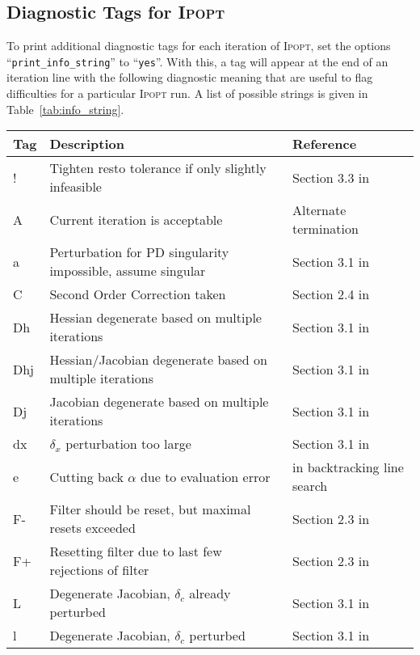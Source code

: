 \documentclass[10pt]{article}
\newcommand{\Ipopt}{\textsc{Ipopt}\xspace}
\begin{document}
\subsection{Diagnostic Tags for \Ipopt}

To print additional diagnostic tags for each iteration of \Ipopt, set
the options ``\texttt{print\_info\_string}'' to ``\texttt{yes}''. With
this, a tag will appear at the end of an iteration line with the
following diagnostic meaning that are useful to flag difficulties for
a particular \Ipopt run.  A list of possible strings is given in
Table~\ref{tab:info_string}.

\begin{table}\centering
  \begin{tabular}{@{}lll@{}}
    Tag & Description & Reference \\
    \hline 
    ! & Tighten resto tolerance if only slightly infeasible & Section 3.3 in \cite{WaecBieg06:mp} \\ 
    A & Current iteration is acceptable & Alternate termination \\  
    a & Perturbation for PD singularity impossible, assume singular & Section 3.1 in \cite{WaecBieg06:mp}\\  
    C & Second Order Correction taken & Section 2.4 in \cite{WaecBieg06:mp} \\  
    Dh & Hessian degenerate based on multiple iterations & Section 3.1 in \cite{WaecBieg06:mp}\\  
    Dhj & Hessian/Jacobian degenerate based on multiple iterations & Section 3.1 in \cite{WaecBieg06:mp}\\  
    Dj & Jacobian degenerate based on multiple iterations & Section 3.1 in \cite{WaecBieg06:mp}\\  
    dx & $\delta_x$ perturbation too large & Section 3.1 in \cite{WaecBieg06:mp}\\  
    e & Cutting back $\alpha$ due to evaluation error & in backtracking line search \\  
    F- & Filter should be reset, but maximal resets exceeded & Section 2.3 in \cite{WaecBieg06:mp} \\  
    F+ & Resetting filter due to last few rejections of filter & Section 2.3 in \cite{WaecBieg06:mp} \\  
    L & Degenerate Jacobian, $\delta_c$ already perturbed & Section 3.1 in \cite{WaecBieg06:mp}\\  
    l & Degenerate Jacobian, $\delta_c$ perturbed & Section 3.1 in \cite{WaecBieg06:mp}\\  

\end{tabular}
\end{table}
\end{document}
